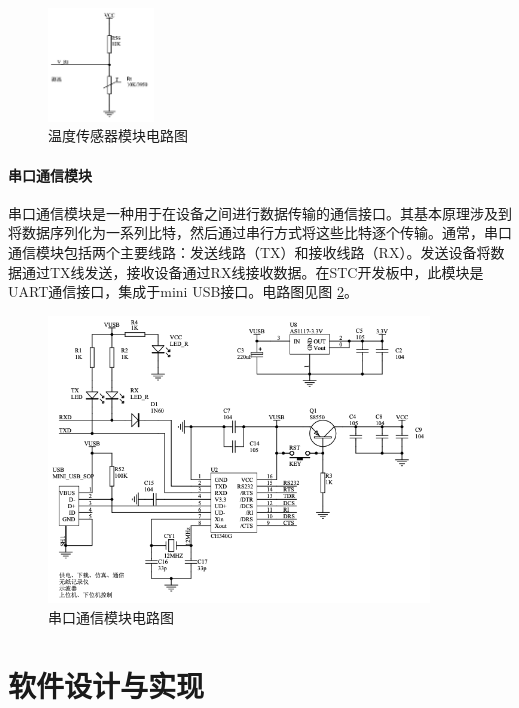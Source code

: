 \documentclass{article}
\begin{document}
\begin{figure}[h]
    \centering
    \includegraphics[width=0.25\textwidth]{rt_diagram}
    \caption{温度传感器模块电路图}
    \label{fig:rt_diagram}
\end{figure}

\paragraph{串口通信模块}
串口通信模块是一种用于在设备之间进行数据传输的通信接口。其基本原理涉及到将数据序列化为一系列比特，然后通过串行方式将这些比特逐个传输。通常，串口通信模块包括两个主要线路：发送线路（TX）和接收线路（RX）。发送设备将数据通过TX线发送，接收设备通过RX线接收数据。在STC开发板中，此模块是UART通信接口，集成于mini USB接口。电路图见图 \ref{fig:serial_diagram}。

\begin{figure}[h]
    \centering
    \includegraphics[width=0.9\textwidth]{serial_diagram}
    \caption{串口通信模块电路图}
    \label{fig:serial_diagram}
\end{figure}

\section{软件设计与实现}
\end{document}
